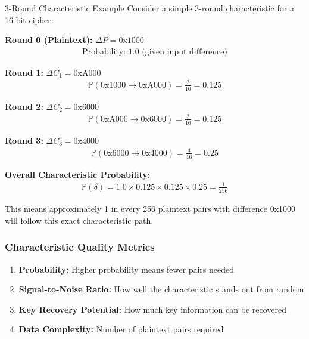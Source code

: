 \documentclass[12pt,a4paper]{article}
\theoremstyle{definition}
\newcommand{\diff}{\Delta}
\newcommand{\prob}{\mathbb{P}}
\newcommand{\diffchar}{\delta}
\begin{document}
\begin{examplebox}{3-Round Characteristic Example}
Consider a simple 3-round characteristic for a 16-bit cipher:

\textbf{Round 0 (Plaintext):} $\diff P = \text{0x1000}$
\begin{align}
\text{Probability: } 1.0 \text{ (given input difference)}
\end{align}

\textbf{Round 1:} $\diff C_1 = \text{0xA000}$
\begin{align}
\prob(\text{0x1000} \rightarrow \text{0xA000}) = \frac{2}{16} = 0.125
\end{align}

\textbf{Round 2:} $\diff C_2 = \text{0x6000}$
\begin{align}
\prob(\text{0xA000} \rightarrow \text{0x6000}) = \frac{2}{16} = 0.125
\end{align}

\textbf{Round 3:} $\diff C_3 = \text{0x4000}$
\begin{align}
\prob(\text{0x6000} \rightarrow \text{0x4000}) = \frac{4}{16} = 0.25
\end{align}

\textbf{Overall Characteristic Probability:}
\begin{align}
\prob(\diffchar) = 1.0 \times 0.125 \times 0.125 \times 0.25 = \frac{1}{256}
\end{align}

This means approximately 1 in every 256 plaintext pairs with difference 0x1000 will follow this exact characteristic path.
\end{examplebox}

\subsubsection{Characteristic Quality Metrics}

\begin{enumerate}
    \item \textbf{Probability:} Higher probability means fewer pairs needed
    \item \textbf{Signal-to-Noise Ratio:} How well the characteristic stands out from random
    \item \textbf{Key Recovery Potential:} How much key information can be recovered
    \item \textbf{Data Complexity:} Number of plaintext pairs required
\end{enumerate}
\end{document}
